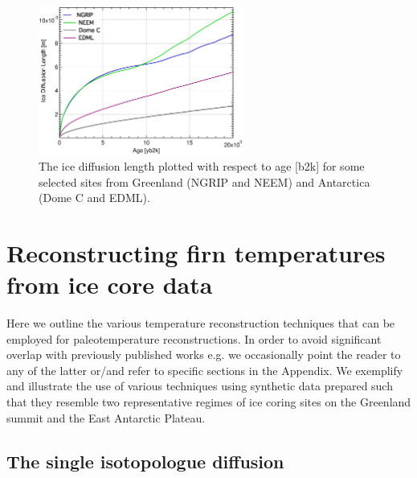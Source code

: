 \documentclass[11pt, draftcls, onecolumn]{IEEEtran} %
\numberwithin{equation}{section}
\numberwithin{table}{section}
\numberwithin{figure}{section}
\begin{document}
\begin{figure}[]
	\vspace*{2mm}
	\begin{center}
		\includegraphics[width=0.6\textwidth]{./Figure_3}
		\caption{The ice diffusion length plotted with respect to age [b2k]
			for some selected sites from Greenland (NGRIP and NEEM) and Antarctica (Dome C and EDML).} 
		\label{fig:ice_diffusion_multi}
	\end{center}
\end{figure}

\section{Reconstructing firn temperatures from ice core data}  \label{sec:methods}

Here we outline 
the various temperature reconstruction techniques that can be employed for 
paleotemperature reconstructions.
In order to avoid
significant overlap  with previously published works
e.g. \citet{Johnsen1977, Johnsen2000, Simonsen2011, Gkinis2014, vanderWel2015a} 
we occasionally  point the reader to any of the latter
or/and refer to specific sections in the Appendix.
We exemplify and illustrate the use of various techniques using synthetic data prepared such 
that they resemble  two representative regimes of ice coring sites on the Greenland summit and the 
East Antarctic Plateau. \\

\subsection{The single isotopologue diffusion}\label{sec:single_diffusion}
\end{document}
